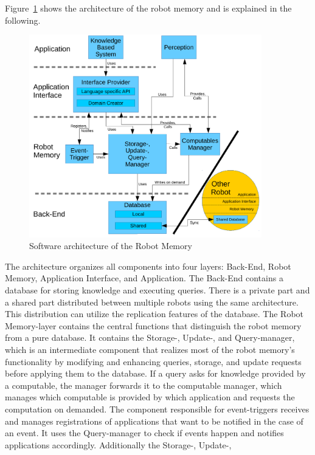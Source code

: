\documentclass[a4paper,11pt]{article}
\newcommand{\reffig}[1]{Figure~\ref{#1}}
\begin{document}
\reffig{fig:arch} shows the architecture of the robot
memory and is explained in the following.
\begin{figure}
  \centering
  \includegraphics[width=0.9\textwidth]{architecture.pdf}
  \vspace{-5mm}
  \caption{Software architecture of the Robot Memory}
  \label{fig:arch}
  \vspace{-5mm}
\end{figure}
The architecture organizes all components into four layers: Back-End,
Robot Memory, Application Interface, and Application. The Back-End
contains a database for storing knowledge and executing
queries. There is a private part and a shared part distributed between
multiple robots using the same architecture. This distribution can
utilize the replication features of the database. The Robot
Memory-layer contains the central functions that distinguish the robot
memory from a pure database. It contains the Storage-, Update-, and
Query-manager, which is an intermediate component that realizes most of
the robot memory's functionality by modifying and enhancing queries,
storage, and update requests before applying them to the database. If a
query asks for knowledge provided by a computable, the manager forwards it to the
computable manager, which manages which computable is provided by
which application and requests the computation on demanded. The
component responsible for event-triggers receives and manages
registrations of applications that want to be notified in the case of
an event. It uses the Query-manager to check if events happen and
notifies applications accordingly. Additionally the Storage-, Update-,
\end{document}
